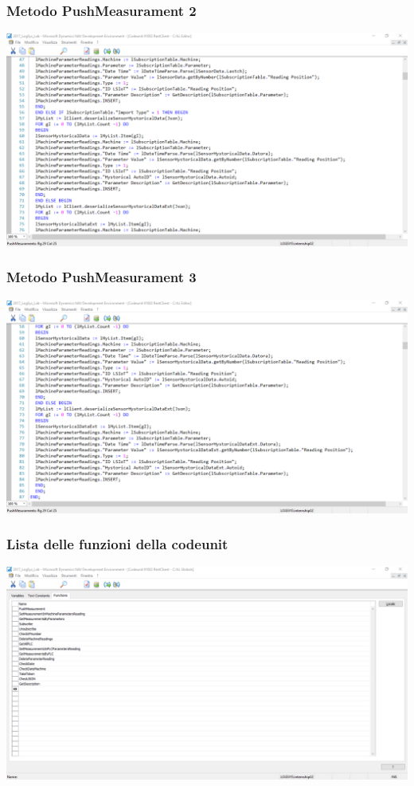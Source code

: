 \documentclass{beamer}
\begin{document}
\begin{frame}
\frametitle{Metodo PushMeasurament 2}
\includegraphics[width=1\textwidth]{images/NAVPushMeasuraments2.png}
\end{frame}

\begin{frame}
\frametitle{Metodo PushMeasurament 3}
\includegraphics[width=1\textwidth]{images/NAVPushMeasuraments3.png}
\end{frame}

\begin{frame}
\frametitle{Lista delle funzioni della codeunit}
\includegraphics[width=1\textwidth]{images/NAVFunctionList.png}
\end{frame}
\end{document}
